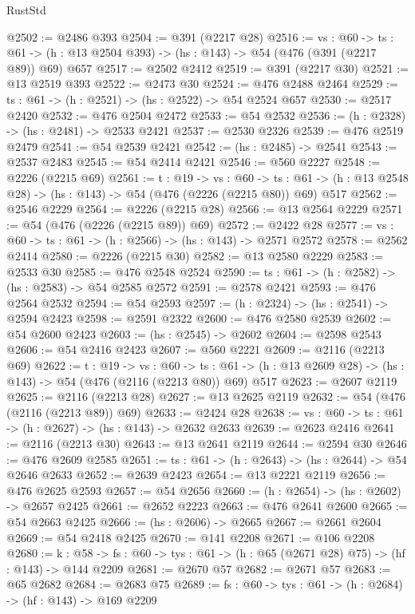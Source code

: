 \begin{lexlean}{RustStd}
\begin{coremodule}
{\begin{coremodule}
{{{{{{{{{{{{{{{{{{{{{{{{{{{{{{{{{{{{{{@2502 := @2486 @393
@2504 := @391 (@2217 @28)
@2516 := {vs : @60} ->
  {ts : @61} -> (h : @13 @2504 @393) -> (hs : @143) -> @54 (@476 (@391 (@2217 @89)) @69) @657
@2517 := @2502 @2412
@2519 := @391 (@2217 @30)
@2521 := @13 @2519 @393
@2522 := @2473 @30
@2524 := @476 @2488 @2464
@2529 := {ts : @61} -> (h : @2521) -> (hs : @2522) -> @54 @2524 @657
@2530 := @2517 @2420
@2532 := @476 @2504 @2472
@2533 := @54 @2532
@2536 := (h : @2328) -> (hs : @2481) -> @2533 @2421
@2537 := @2530 @2326
@2539 := @476 @2519 @2479
@2541 := @54 @2539 @2421
@2542 := (hs : @2485) -> @2541
@2543 := @2537 @2483
@2545 := @54 @2414 @2421
@2546 := @560 @2227
@2548 := @2226 (@2215 @69)
@2561 := {t : @19} ->
  {vs : @60} ->
  {ts : @61} -> (h : @13 @2548 @28) -> (hs : @143) -> @54 (@476 (@2226 (@2215 @80)) @69) @517
@2562 := @2546 @2229
@2564 := @2226 (@2215 @28)
@2566 := @13 @2564 @2229
@2571 := @54 (@476 (@2226 (@2215 @89)) @69)
@2572 := @2422 @28
@2577 := {vs : @60} -> {ts : @61} -> (h : @2566) -> (hs : @143) -> @2571 @2572
@2578 := @2562 @2414
@2580 := @2226 (@2215 @30)
@2582 := @13 @2580 @2229
@2583 := @2533 @30
@2585 := @476 @2548 @2524
@2590 := {ts : @61} -> (h : @2582) -> (hs : @2583) -> @54 @2585 @2572
@2591 := @2578 @2421
@2593 := @476 @2564 @2532
@2594 := @54 @2593
@2597 := (h : @2324) -> (hs : @2541) -> @2594 @2423
@2598 := @2591 @2322
@2600 := @476 @2580 @2539
@2602 := @54 @2600 @2423
@2603 := (hs : @2545) -> @2602
@2604 := @2598 @2543
@2606 := @54 @2416 @2423
@2607 := @560 @2221
@2609 := @2116 (@2213 @69)
@2622 := {t : @19} ->
  {vs : @60} ->
  {ts : @61} -> (h : @13 @2609 @28) -> (hs : @143) -> @54 (@476 (@2116 (@2213 @80)) @69) @517
@2623 := @2607 @2119
@2625 := @2116 (@2213 @28)
@2627 := @13 @2625 @2119
@2632 := @54 (@476 (@2116 (@2213 @89)) @69)
@2633 := @2424 @28
@2638 := {vs : @60} -> {ts : @61} -> (h : @2627) -> (hs : @143) -> @2632 @2633
@2639 := @2623 @2416
@2641 := @2116 (@2213 @30)
@2643 := @13 @2641 @2119
@2644 := @2594 @30
@2646 := @476 @2609 @2585
@2651 := {ts : @61} -> (h : @2643) -> (hs : @2644) -> @54 @2646 @2633
@2652 := @2639 @2423
@2654 := @13 @2221 @2119
@2656 := @476 @2625 @2593
@2657 := @54 @2656
@2660 := (h : @2654) -> (hs : @2602) -> @2657 @2425
@2661 := @2652 @2223
@2663 := @476 @2641 @2600
@2665 := @54 @2663 @2425
@2666 := (hs : @2606) -> @2665
@2667 := @2661 @2604
@2669 := @54 @2418 @2425
@2670 := @141 @2208
@2671 := @106 @2208
@2680 := {k : @58} ->
  {fs : @60} -> {tys : @61} -> (h : @65 (@2671 @28) @75) -> (hf : @143) -> @144 @2209
@2681 := @2670 @57
@2682 := @2671 @57
@2683 := @65 @2682
@2684 := @2683 @75
@2689 := {fs : @60} -> {tys : @61} -> (h : @2684) -> (hf : @143) -> @169 @2209
}}}}}}}}}}}}}}}}}}}}}}}}}}}}}}}}}}}}}}
\end{coremodule}}
\end{coremodule}
\end{lexlean}
